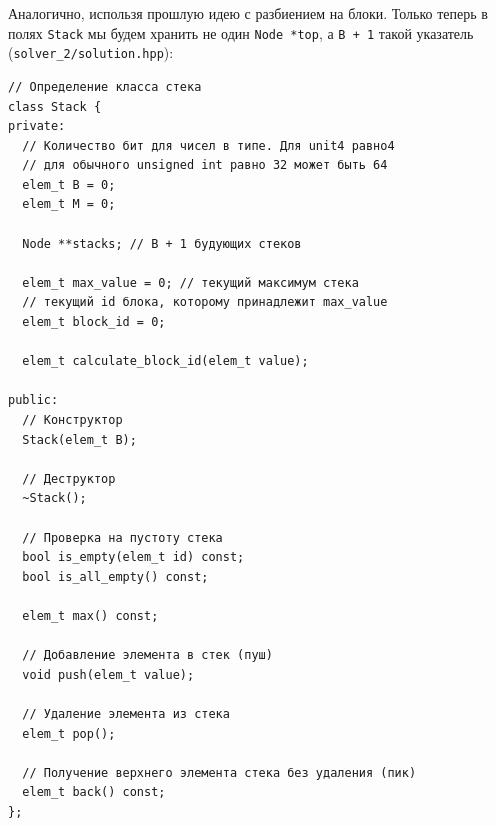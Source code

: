 Аналогично, использя прошлую идею с разбиением на блоки. Только теперь в полях \texttt{Stack} мы будем хранить не один \texttt{Node *top}, а \texttt{B + 1} такой указатель (\texttt{solver_2/solution.hpp}):
\begin{verbatim}
// Определение класса стека
class Stack {
private:
  // Количество бит для чисел в типе. Для unit4 равно4
  // для обычного unsigned int равно 32 может быть 64
  elem_t B = 0;
  elem_t M = 0;

  Node **stacks; // B + 1 будующих стеков

  elem_t max_value = 0; // текущий максимум стека
  // текущий id блока, которому принадлежит max_value
  elem_t block_id = 0;

  elem_t calculate_block_id(elem_t value);

public:
  // Конструктор
  Stack(elem_t B);

  // Деструктор
  ~Stack();

  // Проверка на пустоту стека
  bool is_empty(elem_t id) const;
  bool is_all_empty() const;

  elem_t max() const;

  // Добавление элемента в стек (пуш)
  void push(elem_t value);

  // Удаление элемента из стека
  elem_t pop();

  // Получение верхнего элемента стека без удаления (пик)
  elem_t back() const;
};
\end{verbatim}

